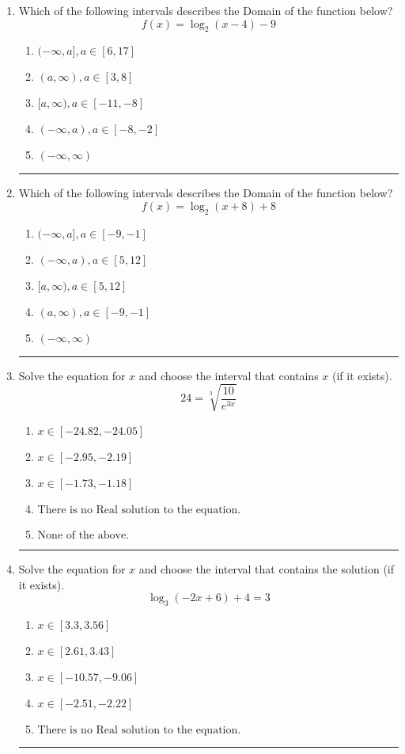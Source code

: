 \documentclass[14pt]{extbook}
\newcommand{\litem}[1]{\item#1\hspace*{-1cm}\rule{\textwidth}{0.4pt}}
\begin{document}
\begin{enumerate}
{\begin{enumerate}[label=\Alph*.]
\end{enumerate} }
\litem{
Which of the following intervals describes the Domain of the function below?\[ f(x) = \log_2{(x-4)}-9 \]\begin{enumerate}[label=\Alph*.]
\item \( (-\infty, a], a \in [6, 17] \)
\item \( (a, \infty), a \in [3, 8] \)
\item \( [a, \infty), a \in [-11, -8] \)
\item \( (-\infty, a), a \in [-8, -2] \)
\item \( (-\infty, \infty) \)

\end{enumerate} }
\litem{
Which of the following intervals describes the Domain of the function below?\[ f(x) = \log_2{(x+8)}+8 \]\begin{enumerate}[label=\Alph*.]
\item \( (-\infty, a], a \in [-9, -1] \)
\item \( (-\infty, a), a \in [5, 12] \)
\item \( [a, \infty), a \in [5, 12] \)
\item \( (a, \infty), a \in [-9, -1] \)
\item \( (-\infty, \infty) \)

\end{enumerate} }
\litem{
 Solve the equation for $x$ and choose the interval that contains $x$ (if it exists).\[  24 = \sqrt[3]{\frac{10}{e^{3x}}} \]\begin{enumerate}[label=\Alph*.]
\item \( x \in [-24.82, -24.05] \)
\item \( x \in [-2.95, -2.19] \)
\item \( x \in [-1.73, -1.18] \)
\item \( \text{There is no Real solution to the equation.} \)
\item \( \text{None of the above.} \)

\end{enumerate} }
\litem{
Solve the equation for $x$ and choose the interval that contains the solution (if it exists).\[ \log_{3}{(-2x+6)}+4 = 3 \]\begin{enumerate}[label=\Alph*.]
\item \( x \in [3.3, 3.56] \)
\item \( x \in [2.61, 3.43] \)
\item \( x \in [-10.57, -9.06] \)
\item \( x \in [-2.51, -2.22] \)
\item \( \text{There is no Real solution to the equation.} \)


\end{enumerate}}
\end{enumerate}
\end{document}
